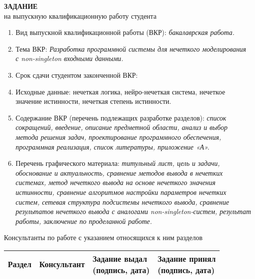 \vspace{1cm}

\begin{center}
  \textbf{ЗАДАНИЕ}\\[0.1em]
  на выпускную квалификационную работу студента\\
\end{center}

\begin{footnotesize}%
\begin{enumerate}[label=\arabic*.]
  \item Вид выпускной квалификационной работы (ВКР): \textit{бакалаврская работа.}
  \item Тема ВКР: \textit{Разработка программной системы для нечеткого моделирования с non-singleton входными данными.}
  \item Срок сдачи студентом законченной ВКР:
  \item Исходные данные: нечеткая логика, нейро-нечеткая система, нечеткое значение истинности, нечеткая степень истинности.
  \item Содержание ВКР (перечень подлежащих разработке разделов): \textit{список сокращений, введение, описание предметной области, анализ и выбор метода решения задач, проектирование программного обеспечения, программная реализация, список литературы, приложение «А».}
  \item Перечень графического материала: \textit{титульный лист, цель и задачи, обоснование и актуальность, сравнение методов вывода в нечетких системах, метод нечеткого вывода на основе нечеткого значения истинности, сравнение алгоритмов настройки параметров нечетких систем, сетевая структура подсистемы нечеткого вывода, сравнение результатов нечеткого вывода с аналогами non-singleton-систем, результат работы, заключение по проделанной работе.}
\end{enumerate}
\end{footnotesize}

\newpage
{}

Консультанты по работе с указанием относящихся к ним разделов

\begin{center}
\setlength\tabcolsep{4pt}
\begin{tabular}{|p{4cm}|p{3cm}|p{4cm}|p{4cm}|}
\hline
\centering Раздел &
\centering Консультант &
\makecell[c]{Задание выдал\\\footnotesize(подпись, дата)} &
\makecell[c]{Задание принял\\\footnotesize(подпись, дата)} \\ \hline
\end{tabular}
\end{center}

